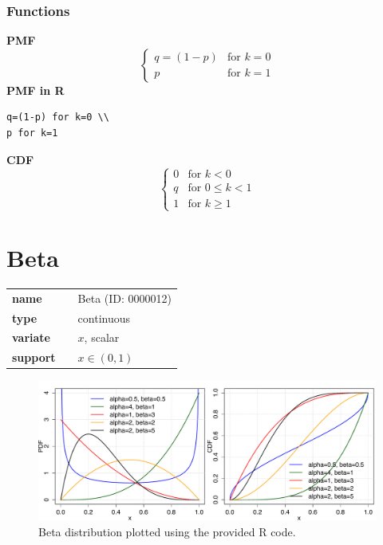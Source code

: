 \documentclass{article}
\begin{document}
\subsubsection*{Functions}

\smallskip \noindent \hspace{.2cm} \textbf{PMF} 
\begin{equation*}\begin{cases}
    q=(1-p) & \text{for }k=0 \\ p & \text{for }k=1
    \end{cases}\end{equation*}
\smallskip \noindent \hspace{.2cm} \textbf{PMF in R}  
\begin{verbatim}q=(1-p) for k=0 \\
p for k=1\end{verbatim}
\smallskip \noindent \hspace{.2cm} \textbf{CDF} 
\begin{equation*}\begin{cases}
    0 & \text{for }k<0 \\ q & \text{for }0\leq k<1 \\ 1 & \text{for }k\geq 1
    \end{cases}\end{equation*}
\smallskip\section*{Beta} 

  \bigskip 

\begin{tabular}{p{2cm}cl}
\textbf{name} & & Beta (ID: 0000012)\\ 
 
\textbf{type} & & continuous \\ 

\textbf{variate} & & $x$, scalar \\ 

\textbf{support} & & $x \in (0,1)$
\end{tabular}

\begin{figure}[ht!]
\centering
  \includegraphics[width=140mm]{pics/Beta.pdf}
 \caption{Beta distribution plotted using the provided R code.}
 \label{fig:Beta}
\end{figure}
\end{document}
